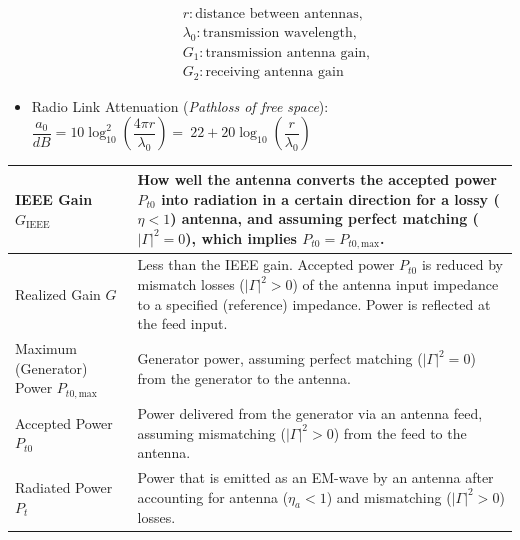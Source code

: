 \begin{itemize}
\begin{align*}
            &r: \text{distance between antennas},\\
            &\lambda_0: \text{transmission wavelength},\\
            &G_1: \text{transmission antenna gain},\\
            &G_2: \text{receiving antenna gain}
        \end{align*}
    \item Radio Link Attenuation (\textit{Pathloss of free space}):\\
        \(\dfrac{a_0}{\si{dB}} = 10 \log_{10}^2\left(\dfrac{4 \pi r}{\lambda_0}\right) =\
        22 + 20 \log_{10}\left(\dfrac{r}{\lambda_0}\right)\)
\end{itemize}

\noindent{}

\begin{tabular}{p{3cm}p{3.8cm}}
        \toprule
        IEEE Gain $G_{\mathrm{IEEE}}$ & How well the antenna converts the accepted power $P_{t0}$ into radiation in a certain direction for a lossy ($\eta<1$) antenna, and assuming perfect matching ($|\Gamma|^2 = 0$), which implies $P_{t0} = P_{t0,\mathrm{max}}$.\\\midrule
         Realized Gain $G$ & Less than the IEEE gain. Accepted power $P_{t0}$ is reduced by mismatch losses ($|\Gamma|^2 > 0$) of the antenna input impedance to a specified (reference) impedance. Power is reflected at the feed input.\\\midrule
        Maximum (Generator) Power $P_{t0,\mathrm{max}}$ & Generator power, assuming perfect matching ($|\Gamma|^2 = 0$) from the generator to the antenna.\\\midrule
        Accepted Power $P_{t0}$ & Power delivered from the generator via an antenna feed, assuming mismatching ($|\Gamma|^2 > 0$) from the feed to the antenna.\\\midrule
        Radiated Power $P_t$ & Power that is emitted as an EM-wave by an antenna after accounting for antenna ($\eta_a < 1$) and mismatching ($|\Gamma|^2 > 0$) losses.\\
        \bottomrule
\end{tabular}

